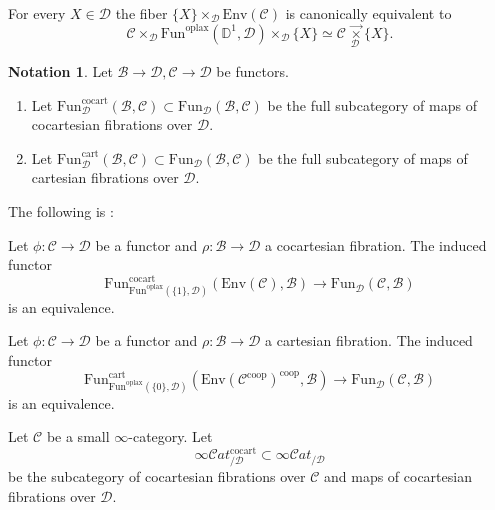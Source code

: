 \documentclass[10pt,oneside]{article}
\numberwithin{equation}{section} %
\numberwithin{figure}{section} %
\theoremstyle{plain}
\theoremstyle{definition}
\newtheorem{notation}[thm]{Notation}
\newcommand{\bD}{{\mathbb D}}
\newcommand{\mB}{{\mathcal B}}
\newcommand{\mC}{{\mathcal C}}
\newcommand{\mD}{{\mathcal D}}
\newcommand{\Env}{{\mathrm{Env}}}
\newcommand{\Fun}{\mathrm{Fun}}
\newcommand{\cocart}{{\mathrm{cocart}}}
\newcommand{\cart}{{\mathrm{cart}}}
\newcommand{\oplax}{{\mathrm{oplax}}}
\newcommand{\coop}{\mathrm{coop}}
\newcommand{\scat}{\mathcal{C}\mathit{at}}
\begin{document}
\begin{remark}
For every $X \in \mD$ the fiber $\{X\} \times_\mD \Env(\mC)$
is canonically equivalent to $$ \mC \times_{\mD} \Fun^\oplax(\bD^1,\mD) \times_\mD \{X\} \simeq \mC \underset{\mD}{{\,\vec{\times}}} \{X\} .$$

    
\end{remark}



\begin{notation}

Let $\mB \to \mD, \mC \to \mD$ be functors.
\begin{enumerate}[\normalfont(1)]\setlength{\itemsep}{-2pt}

\item Let $\Fun_\mD^\cocart(\mB,\mC) \subset \Fun_\mD(\mB,\mC) $
be the full subcategory of maps of cocartesian fibrations over $\mD.$

\item Let $\Fun_\mD^\cart(\mB,\mC) \subset \Fun_\mD(\mB,\mC) $
be the full subcategory of maps of cartesian fibrations over $\mD.$

\end{enumerate}

\end{notation}

The following is \cite[Theorem 4.5.6.]{gepner2026fibrations}:

\begin{theorem}\label{envelo}

Let $\phi: \mC \to \mD $ be a functor and
$\rho: \mB \to \mD $ a cocartesian fibration.
The induced functor
$$ \Fun^\cocart_{\Fun^\oplax(\{1\},\mD)}(\Env(\mC),\mB) \to \Fun_\mD(\mC,\mB) $$
is an equivalence.

\end{theorem}

\begin{corollary}\label{envelo2}
Let $\phi: \mC \to \mD $ be a functor and
$\rho: \mB \to \mD $ a cartesian fibration.
The induced functor
$$ \Fun^\cart_{\Fun^\oplax(\{0\},\mD)}(\Env(\mC^\coop)^\coop,\mB) \to \Fun_\mD(\mC,\mB) $$
is an equivalence.
\end{corollary}

\begin{definition}Let $\mC$ be a small $\infty$-category.
Let $$ \infty\scat^\cocart_{/\mD}\subset \infty\scat_{/\mD} $$
be the subcategory of cocartesian fibrations over $\mC$ and maps of cocartesian fibrations over $\mD$.
\end{definition}
\end{document}
